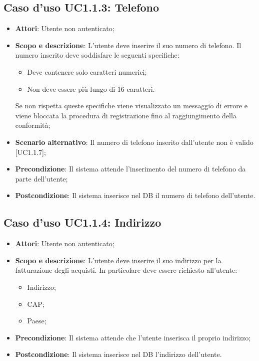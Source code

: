 \documentclass[12pt,a4paper,titlepage]{article}
\begin{document}
	\subsection{Caso d'uso UC1.1.3: Telefono}
	\label{UC1.1.3}
	\begin{itemize}
		\item \textbf{Attori}: Utente non autenticato;
		\item \textbf{Scopo e descrizione}: L'utente deve inserire il suo numero di telefono. Il numero inserito deve soddisfare le seguenti specifiche:
			\begin{itemize}
			\item Deve contenere solo caratteri numerici;
			\item Non deve essere più lungo di 16 caratteri.
		\end{itemize}
		Se non rispetta queste specifiche viene visualizzato un messaggio di errore e viene bloccata la procedura di registrazione fino al raggiungimento della conformità;
		\item \textbf{Scenario alternativo}: Il numero di telefono inserito dall'utente non è valido [UC1.1.7];
		\item \textbf{Precondizione}: Il sistema attende l'inserimento del numero di telefono da parte dell'utente;
		\item \textbf{Postcondizione}: Il sistema inserisce nel DB il numero di telefono dell'utente.
	\end{itemize}
	\subsection{Caso d'uso UC1.1.4: Indirizzo}
	\label{UC1.1.4}
	\begin{itemize}
		\item \textbf{Attori}: Utente non autenticato;
		\item \textbf{Scopo e descrizione}: L'utente deve inserire il suo indirizzo per la fatturazione degli acquisti. In particolare deve essere richiesto all'utente:
		\begin{itemize}
			\item Indirizzo;
			\item CAP;
			\item Paese;
		\end{itemize}
		\item \textbf{Precondizione}: Il sistema attende che l'utente inserisca il proprio indirizzo;
		\item \textbf{Postcondizione}: Il sistema inserisce nel DB l'indirizzo dell'utente.
	\end{itemize}
\end{document}
